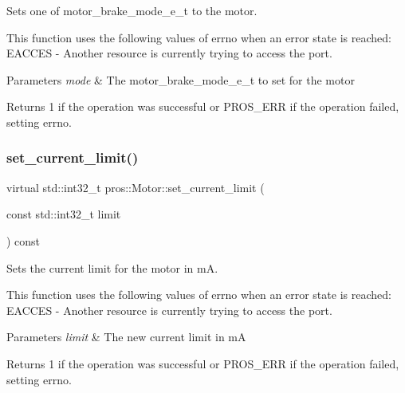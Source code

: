 Sets one of motor\+\_\+brake\+\_\+mode\+\_\+e\+\_\+t to the motor. 

This function uses the following values of errno when an error state is reached\+: E\+A\+C\+C\+ES -\/ Another resource is currently trying to access the port.


\begin{DoxyParams}{Parameters}
{\em mode} & The motor\+\_\+brake\+\_\+mode\+\_\+e\+\_\+t to set for the motor\\
\hline
\end{DoxyParams}
\begin{DoxyReturn}{Returns}
1 if the operation was successful or P\+R\+O\+S\+\_\+\+E\+RR if the operation failed, setting errno. 
\end{DoxyReturn}
\mbox{\label{classpros_1_1Motor_a4c496dfb0b33f989d7329a61b7b6d6ba}} 
\subsubsection{\texorpdfstring{set\_current\_limit()}{set\_current\_limit()}}
{\footnotesize\ttfamily virtual std\+::int32\+\_\+t pros\+::\+Motor\+::set\+\_\+current\+\_\+limit (\begin{DoxyParamCaption}\item[{const std\+::int32\+\_\+t}]{limit }\end{DoxyParamCaption}) const\hspace{0.3cm}{\ttfamily [virtual]}}



Sets the current limit for the motor in mA. 

This function uses the following values of errno when an error state is reached\+: E\+A\+C\+C\+ES -\/ Another resource is currently trying to access the port.


\begin{DoxyParams}{Parameters}
{\em limit} & The new current limit in mA\\
\hline
\end{DoxyParams}
\begin{DoxyReturn}{Returns}
1 if the operation was successful or P\+R\+O\+S\+\_\+\+E\+RR if the operation failed, setting errno. 
\end{DoxyReturn}
\mbox{\label{classpros_1_1Motor_a2d2fea8d5967d1e41471111aa89afd84}} 
